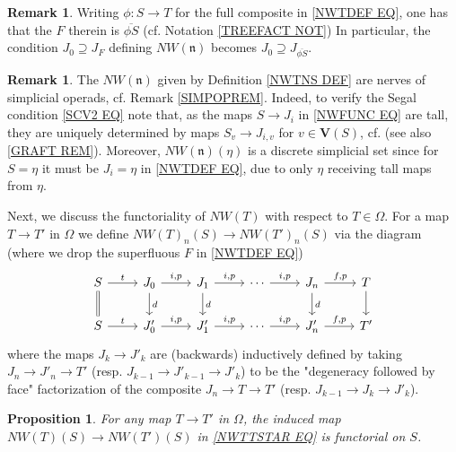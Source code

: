 \documentclass[a4paper,10pt]{article}%
\numberwithin{equation}{section}
\numberwithin{figure}{section}
\newtheorem{proposition}[equation]{Proposition}%
\theoremstyle{definition} %
\newtheorem{remark}[equation]{Remark}%
\begin{document}
\begin{remark}\label{J0JFREPACK REM}
	Writing $\phi \colon S \to T$ for the full composite in \eqref{NWTDEF EQ},
	one has that the $F$ therein is $\overline{\phi S}$
	(cf. Notation \ref{TREEFACT NOT})
	In particular, the condition $J_0 \supseteq J_F$
	defining $NW(\mathfrak{n})$
	becomes $J_0 \supseteq J_{\overline{\phi S}}$.
\end{remark}


\begin{remark}\label{NWTNS_REM}
	The $NW(\mathfrak{n})$ given by Definition \ref{NWTNS DEF}
	are nerves of simplicial operads,
	cf. Remark \ref{SIMPOPREM}.
	Indeed, to verify the Segal condition \eqref{SCV2 EQ} note that,
	as the maps $S \to J_i$ in \eqref{NWFUNC EQ}
	are tall, they are uniquely determined by maps
	$S_v \to J_{i,v}$ for $v \in \boldsymbol{V}(S)$,
	cf. \cite[Cor 3.75]{BP_geo} 
	(see also \ref{GRAFT REM}).
	Moreover,  $NW(\mathfrak{n})(\eta)$ is a discrete simplicial set
	since for $S=\eta$ it must be $J_i = \eta$ in \eqref{NWTDEF EQ},
	due to only $\eta$ receiving tall maps from $\eta$.
\end{remark}


Next, we discuss the functoriality of
$NW(T)$ with respect to $T \in \Omega$.
%
For a map $T \to T'$ in $\Omega$ we define
$NW(T)_n(S)
	\to 
NW(T')_n(S)$
via the diagram (where we drop the superfluous $F$ in \eqref{NWTDEF EQ})
\begin{equation}\label{NWTTSTAR EQ}
\begin{tikzcd}
	S \ar{r}{t} \ar[equal]{d}
&
	J_0 \ar{r}{i,p} \ar{d}{d}
&
	J_1 \ar{r}{i,p} \ar{d}{d}
&
	\cdots \ar{r}{i,p}
&
J_n \ar{r}{f,p} \ar{d}{d}
&
	T \ar{d}
\\
	S \ar{r}{t} 
&
	J'_0 \ar{r}{i,p}
&
	J'_1 \ar{r}{i,p}
&
	\cdots \ar{r}{i,p}
&
	J'_n \ar{r}{f,p}
&
	T'
\end{tikzcd}
\end{equation}
where the maps $J_k \to J'_k$
are (backwards) inductively defined
by taking 
$J_n \to J'_n \to T'$
(resp. 
$J_{k-1} \to J'_{k-1} \to J'_k$)
to be the "degeneracy followed by face"
factorization of the composite
$J_n \to T \to T'$
(resp.
$J_{k-1} \to J_{k} \to J'_k$).



\begin{proposition}\label{NWTNS_NAT_PROP}
	For any map $T \to T'$ in $\Omega$, the induced map
	$NW(T)(S)
	\to 
	NW(T')(S)$
	in 
	\eqref{NWTTSTAR EQ}
	is functorial on $S$.
\end{proposition}
\end{document}
